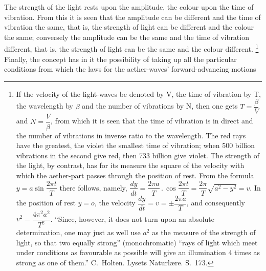 \documentclass[12pt,a4paper]{book}
\renewcommand{\thefootnote}{*)}
\begin{document}
\renewcommand{\thefootnote}{*)}
The strength of the light rests upon the amplitude, the colour upon the time of vibration. From this it is seen that the
amplitude can be different and the time of vibration the same, that is, the strength of light can be different and the
colour the same; conversely the amplitude can be the same and the time of vibration different, that is, the strength of
light can be the same and the colour different.%
\footnote{%
If the velocity of the light-waves be denoted by V, the time of vibration by T, the wavelength by $\beta$ and the number
of vibrations by N, then one gets $T = \dfrac{\beta}{V}$ and $N = \dfrac{V}{\beta}$, from which it is seen that the time
of vibration is in direct and the number of vibrations in inverse ratio to the wavelength. The red rays have the
greatest, the violet the smallest time of vibration; when 500 billion vibrations in the second give red, then 733
billion give violet. The strength of the light, by contrast, has for its measure the square of the velocity with which
the aether-part passes through the position of rest. From the formula $y = a\sin\dfrac{2\pi t}{T}$ there follows, namely,
$\dfrac{dy}{dt} = \dfrac{2\pi a}{T}\,.\,\cos\dfrac{2\pi t}{T}
 = \dfrac{2\pi}{T}\sqrt{a^{2}-y^{2}} = v$. In the position of rest $y = o$, the velocity
$\dfrac{dy}{dt} = v = \pm\dfrac{2\pi a}{T}$, and consequently
$v^{2} = \dfrac{4\pi^{2}a^{2}}{T^{2}}$. ``Since, however, it does not turn upon an absolute determination, one may just
as well use $a^{2}$ as the measure of the strength of light, so that two equally strong'' (monochromatic) ``rays of
light which meet under conditions as favourable as possible will give an illumination 4 times as strong as one of
them.'' C.\ Holten. Lysets Naturlære. S.\ 173.}
Finally,
the concept has in it the possibility of taking up all the particular conditions from which the laws for the
aether-waves' forward-advancing motions
%
\end{document}
